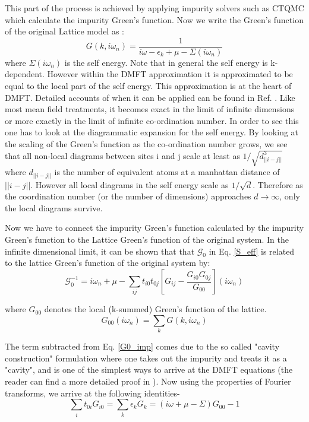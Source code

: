 \documentclass[10pt]{ruthesis}
\begin{document}
This part of the process is achieved by applying impurity solvers such as CTQMC which calculate the impurity Green's function. Now we write the Green's function of the original Lattice model as :
\begin{equation}
G(k,i\omega_n)=\dfrac{1}{i\omega -\epsilon_k +\mu -\Sigma(i\omega_n)}
\end{equation}
 where $\Sigma(i\omega_n)$ is the self energy. Note that in general the self energy is k-dependent. However within the DMFT approximation it is approximated to be equal to  the local part of the self energy. This approximation is at the heart of DMFT. Detailed accounts of when it can be applied can be found in Ref. \cite{Kotliar_RMP}. Like most mean field treatments, it becomes exact in the limit of infinite dimensions or more exactly in the limit of infinite co-ordination number. In order to see this one has to look at the diagrammatic expansion for the self energy. By looking at the scaling of the Green's function as the co-ordination number grows, we see that all non-local diagrams between sites i and j scale at least as $1/\sqrt{d_{||i-j||}^3}$ where $d_{||i-j||}$ is the number of equivalent atoms at a manhattan distance of $||i-j||$. However all local diagrams in the self energy scale as $1/\sqrt{d}$. Therefore as the coordination number (or the number of dimensions) approaches $d \rightarrow \infty$, only the local diagrams survive. 
 
 Now we have to connect the impurity Green's function calculated by the impurity Green's function to the Lattice Green's function of the original system. In the infinite dimensional limit, it can be shown that that $\mathcal{G}_0$ in Eq. \ref{S_eff} is related to the lattice Green's function of the original system by:
 \begin{equation}
  \mathcal{G}_0^{-1}= i\omega_n +\mu -\sum_{ij} t_{i0}t_{0j}[G_{ij} -\dfrac{G_{i0}G_{0j}}{G_{00}}](i \omega_n)
  \end{equation}
  
  where $G_{00}$ denotes the local (k-summed) Green's function of the lattice.
\begin{equation}
  G_{00}(i\omega_n)=\sum_k G(k,i\omega_n)
 \end{equation} 

  The term subtracted from Eq. \ref{G0_imp} comes due to the so called "cavity construction" formulation where one takes out the impurity and treats it as a "cavity", and is one of the simplest ways to arrive at the DMFT equations (the reader can find a more detailed proof in \cite{Held_Review,Kotliar_RMP}). Now using the properties of Fourier transforms, we arrive at the following identities-
  \begin{equation}
  \sum_{i} t_{0i} G_{i0}= \sum_{k}\epsilon_k G_k= (i\omega +\mu -\Sigma)G_{00} -1
  \end{equation}
 
\end{document}

